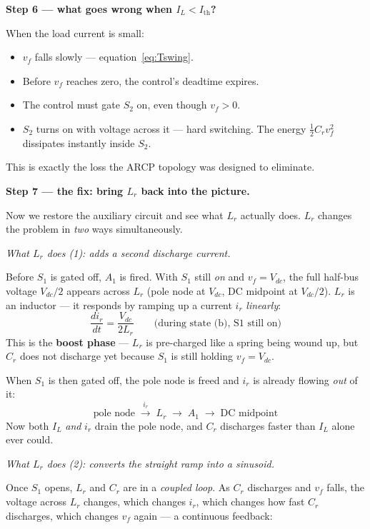 \documentclass[12pt, a4paper]{article}
\newcommand{\Vdc}{V_{dc}}
\newcommand{\vf}{v_f}
\newcommand{\ir}{i_r}
\newcommand{\IL}{I_L}
\newcommand{\Lr}{L_r}
\begin{document}
\medskip
\textbf{Step 6 --- what goes wrong when $\IL < I_\text{th}$?}

When the load current is small:
\begin{itemize}
    \item $\vf$ falls slowly --- equation~\eqref{eq:Tswing}.
    \item Before $\vf$ reaches zero, the control's deadtime expires.
    \item The control must gate $S_2$ on, even though $\vf > 0$.
    \item $S_2$ turns on with voltage across it --- hard switching.
          The energy $\tfrac{1}{2}C_r \vf^2$ dissipates instantly inside
          $S_2$.
\end{itemize}
This is exactly the loss the ARCP topology was designed to eliminate.

\medskip
\textbf{Step 7 --- the fix: bring $\Lr$ back into the picture.}

Now we restore the auxiliary circuit and see what $\Lr$ actually does.
$\Lr$ changes the problem in \emph{two} ways simultaneously.

\medskip
\textit{What $\Lr$ does (1): adds a second discharge current.}

Before $S_1$ is gated off, $A_1$ is fired.
With $S_1$ still \emph{on} and $\vf = \Vdc$, the full half-bus voltage
$\Vdc/2$ appears across $\Lr$ (pole node at $\Vdc$, DC midpoint at
$\Vdc/2$).
$\Lr$ is an inductor --- it responds by ramping up a current $\ir$
\emph{linearly}:
\[
    \frac{d\ir}{dt} = \frac{\Vdc}{2\Lr} \qquad
    \text{(during state~(b), S1 still on)}
\]
This is the \textbf{boost phase} --- $\Lr$ is pre-charged like a spring
being wound up, but $C_r$ does not discharge yet because $S_1$ is still
holding $\vf = \Vdc$.

When $S_1$ is then gated off, the pole node is freed and $\ir$ is already
flowing \emph{out} of it:
\[
    \text{pole node} \;\xrightarrow{\;\ir\;}\; \Lr \;\xrightarrow{}\;
    A_1 \;\longrightarrow\; \text{DC midpoint}
\]
Now both $\IL$ \emph{and} $\ir$ drain the pole node, and $C_r$
discharges faster than $\IL$ alone ever could.

\medskip
\textit{What $\Lr$ does (2): converts the straight ramp into a
sinusoid.}

Once $S_1$ opens, $\Lr$ and $C_r$ are in a \emph{coupled loop}.
As $C_r$ discharges and $\vf$ falls, the voltage across $\Lr$ changes,
which changes $\ir$, which changes how fast $C_r$ discharges, which
changes $\vf$ again --- a continuous feedback:
\end{document}
